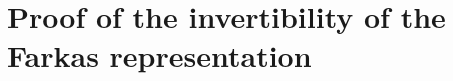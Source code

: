 
\appendix

\section{Proof of the invertibility of the Farkas representation}
\label{sec:farkproof}
